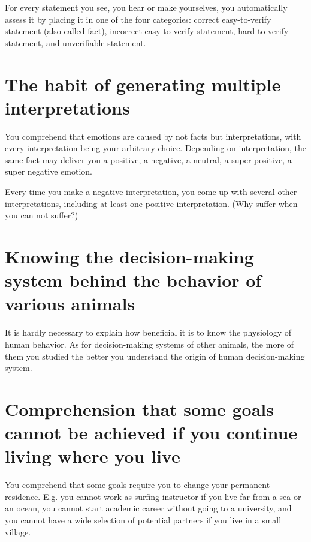 \documentclass[11pt]{article}
\theoremstyle{remark}
\theoremstyle{definition}
\begin{document}
For every statement you see, you hear or make yourselves, you automatically assess it by placing it in one of the four categories: correct easy-to-verify statement (also called fact), incorrect easy-to-verify statement, hard-to-verify statement, and unverifiable statement.






\section{The habit of generating multiple interpretations}


You comprehend that emotions are caused by not facts but interpretations, with every interpretation being your arbitrary choice. Depending on interpretation, the same fact may deliver you a positive, a negative, a neutral, a super positive, a super negative emotion. 

Every time you make a negative interpretation, you come up with several other interpretations, including at least one positive interpretation. (Why suffer when you can not suffer?)





\section{Knowing the decision-making system behind the behavior of various animals}

It is hardly necessary to explain how beneficial it is to know the physiology of human behavior. As for decision-making systems of other animals, the more of them you studied the better you understand the origin of human decision-making system.




\section{Comprehension that some goals cannot be achieved if you continue living where you live}



You comprehend that some goals require you to change your permanent residence. E.g. you cannot work as surfing instructor if you live far from a sea or an ocean, you cannot start academic career without going to a university, and you cannot have a wide selection of potential partners if you live in a small village.
\end{document}
